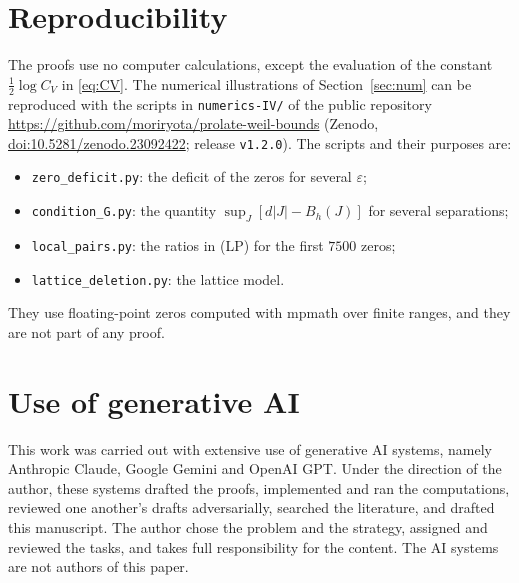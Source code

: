 \documentclass[11pt]{amsart}
\newcommand{\doi}[1]{\href{https://doi.org/#1}{doi:#1}}
\theoremstyle{definition}
\theoremstyle{remark}
\numberwithin{equation}{section}
\begin{document}
\section*{Reproducibility}
The proofs use no computer calculations, except the evaluation of the constant $\frac12\log C_V$ in \eqref{eq:CV}. The numerical illustrations of Section~\ref{sec:num} can be reproduced with the scripts in \texttt{numerics-IV/} of the public repository \url{https://github.com/moriryota/prolate-weil-bounds} (Zenodo, \doi{10.5281/zenodo.23092422}; release \texttt{v1.2.0}). The scripts and their purposes are:
\begin{itemize}
\item \texttt{zero\_deficit.py}: the deficit of the zeros for several $\varepsilon$;
\item \texttt{condition\_G.py}: the quantity $\sup_J[d|J|-B_h(J)]$ for several separations;
\item \texttt{local\_pairs.py}: the ratios in (LP) for the first $7500$ zeros;
\item \texttt{lattice\_deletion.py}: the lattice model.
\end{itemize}
They use floating-point zeros computed with mpmath over finite ranges, and they are not part of any proof.

\section*{Use of generative AI}
This work was carried out with extensive use of generative AI systems, namely Anthropic Claude, Google Gemini and OpenAI GPT. Under the direction of the author, these systems drafted the proofs, implemented and ran the computations, reviewed one another's drafts adversarially, searched the literature, and drafted this manuscript. The author chose the problem and the strategy, assigned and reviewed the tasks, and takes full responsibility for the content. The AI systems are not authors of this paper.
\end{document}
